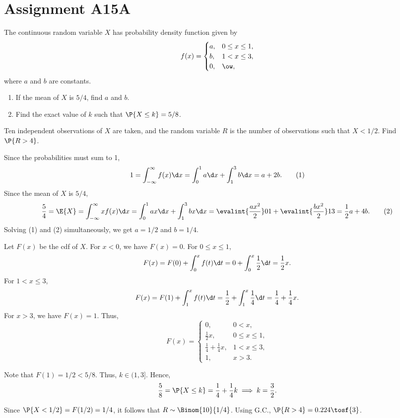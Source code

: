 \section{Assignment A15A}

\begin{problem}
    The continuous random variable $X$ has probability density function given by \[f(x) = \begin{cases}
        a, & 0 \leq x \leq 1,\\
        b, & 1 < x \leq 3,\\
        0, & \ow,
    \end{cases}\] where $a$ and $b$ are constants.

    \begin{enumerate}
        \item If the mean of $X$ is $5/4$, find $a$ and $b$.
        \item Find the exact value of $k$ such that $\P{X \leq k} = 5/8$.
    \end{enumerate}

    Ten independent observations of $X$ are taken, and the random variable $R$ is the number of observations such that $X < 1/2$. Find $\P{R > 4}$.
\end{problem}
\begin{solution}
    \begin{ppart}
        Since the probabilities must sum to 1, \[1 = \int_{-\infty}^\infty f(x) \d x = \int_0^1 a \d x + \int_1^3 b \d x = a + 2b. \tag{1}\] Since the mean of $X$ is $5/4$, \[\frac54 = \E{X} = \int_{-\infty}^\infty x f(x) \d x = \int_0^1 ax \d x + \int_1^3 bx \d x = \evalint{\frac{ax^2}{2}}01 + \evalint{\frac{bx^2}2}13 = \frac12 a + 4b. \tag{2}\] Solving (1) and (2) simultaneously, we get $a = 1/2$ and $b = 1/4$.
    \end{ppart}
    \begin{ppart}
        Let $F(x)$ be the cdf of $X$. For $x < 0$, we have $F(x) = 0$. For $0 \leq x \leq 1$, \[F(x) = F(0) + \int_0^x f(t) \d t = 0 + \int_0^x \frac12 \d t = \frac12 x.\] For $1 < x \leq 3$, \[F(x) = F(1) + \int_1^x f(t) \d t = \frac12 + \int_1^x \frac14 \d t = \frac14 + \frac14 x.\] For $x > 3$, we have $F(x) = 1$. Thus, \[F(x) = \begin{cases}
            0, & 0 < x,\\
            \frac12 x, & 0 \leq x \leq 1,\\
            \frac14 + \frac14 x, & 1 < x \leq 3,\\
            1, & x > 3.
        \end{cases}\]

        Note that $F(1) = 1/2 < 5/8$. Thus, $k \in (1, 3]$. Hence, \[\frac58 = \P{X \leq k} = \frac14 + \frac14 k \implies k = \frac32.\]
    \end{ppart}

    Since $\P{X < 1/2} = F(1/2) = 1/4$, it follows that $R \sim \Binom{10}{1/4}$. Using G.C., $\P{R > 4} = 0.224 \tosf{3}$.
\end{solution}


